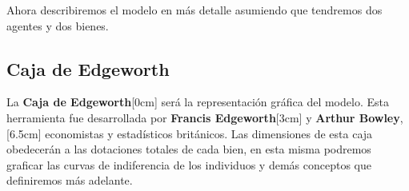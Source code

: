 Ahora describiremos el modelo en más detalle asumiendo que tendremos dos agentes y dos bienes. 

\subsection{Caja de Edgeworth}

La \textbf{Caja de Edgeworth}[0cm] será la representación gráfica del modelo. Esta herramienta fue desarrollada por \textbf{Francis Edgeworth}[3cm] y \textbf{Arthur Bowley},[6.5cm] economistas y estadísticos británicos. Las dimensiones de esta caja obedecerán a las dotaciones totales de cada bien, en esta misma podremos graficar las curvas de indiferencia de los individuos y demás conceptos que definiremos más adelante. 

